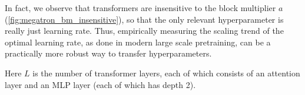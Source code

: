In fact, we observe that transformers are insensitive to the block multiplier $a$ (\cref{fig:megatron_bm_insensitive}), so that the only relevant hyperparameter is really just learning rate. Thus, empirically measuring the scaling trend of the optimal learning rate, as done in modern large scale pretraining, can be a practically more robust way to transfer hyperparameters.

Here $L$ is the number of transformer layers, each of which consists of an attention layer and an MLP layer (each of which has depth 2).

